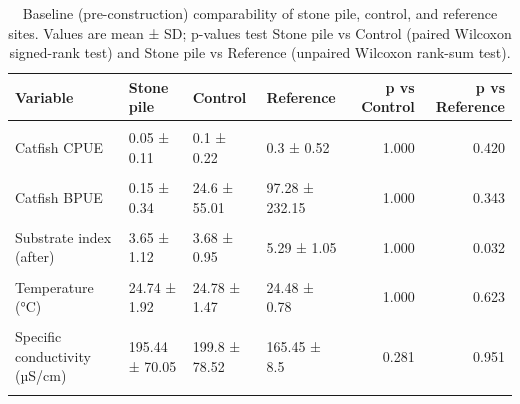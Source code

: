 \documentclass[
  12pt,
  a4paper,
  oneside]{scrbook}
\begin{document}
\begingroup\fontsize{8}{10}\selectfont

\begin{longtable}[t]{llllrr}

\caption{\label{tbl-baseline-combined-supp}Baseline (pre-construction)
comparability of stone pile, control, and reference sites. Values are
mean ± SD; p-values test Stone pile vs Control (paired Wilcoxon
signed-rank test) and Stone pile vs Reference (unpaired Wilcoxon
rank-sum test).}

\tabularnewline

\toprule
Variable & Stone pile & Control & Reference & p vs Control & p vs Reference\\
\midrule
\cellcolor{gray!8}{Kōura CPUE} & \cellcolor{gray!8}{0.2 ± 0.27} & \cellcolor{gray!8}{0.15 ± 0.22} & \cellcolor{gray!8}{2.13 ± 2.32} & \cellcolor{gray!8}{1.000} & \cellcolor{gray!8}{0.205}\\
Catfish CPUE & 0.05 ± 0.11 & 0.1 ± 0.22 & 0.3 ± 0.52 & 1.000 & 0.420\\
\cellcolor{gray!8}{Kōura BPUE} & \cellcolor{gray!8}{7.95 ± 12.15} & \cellcolor{gray!8}{2.8 ± 3.84} & \cellcolor{gray!8}{36.69 ± 36.82} & \cellcolor{gray!8}{0.789} & \cellcolor{gray!8}{0.206}\\
Catfish BPUE & 0.15 ± 0.34 & 24.6 ± 55.01 & 97.28 ± 232.15 & 1.000 & 0.343\\
\cellcolor{gray!8}{Substrate index (before)} & \cellcolor{gray!8}{3.39 ± 1.07} & \cellcolor{gray!8}{3.68 ± 0.95} & \cellcolor{gray!8}{5.29 ± 1.05} & \cellcolor{gray!8}{0.789} & \cellcolor{gray!8}{0.012}\\
\addlinespace
Substrate index (after) & 3.65 ± 1.12 & 3.68 ± 0.95 & 5.29 ± 1.05 & 1.000 & 0.032\\
\cellcolor{gray!8}{Slope (0–20 m)} & \cellcolor{gray!8}{0.06 ± 0.05} & \cellcolor{gray!8}{0.06 ± 0.04} & \cellcolor{gray!8}{0.09 ± 0.05} & \cellcolor{gray!8}{0.590} & \cellcolor{gray!8}{0.245}\\
Temperature (°C) & 24.74 ± 1.92 & 24.78 ± 1.47 & 24.48 ± 0.78 & 1.000 & 0.623\\
\cellcolor{gray!8}{Dissolved oxygen (mg/L)} & \cellcolor{gray!8}{9.85 ± 1.48} & \cellcolor{gray!8}{9.63 ± 1.29} & \cellcolor{gray!8}{10.03 ± 0.86} & \cellcolor{gray!8}{0.418} & \cellcolor{gray!8}{0.426}\\
Specific conductivity (µS/cm) & 195.44 ± 70.05 & 199.8 ± 78.52 & 165.45 ± 8.5 & 0.281 & 0.951\\
\addlinespace
\cellcolor{gray!8}{pH} & \cellcolor{gray!8}{7.5 ± 2.15} & \cellcolor{gray!8}{7.61 ± 2.2} & \cellcolor{gray!8}{8.53 ± 0.66} & \cellcolor{gray!8}{1.000} & \cellcolor{gray!8}{0.426}\\
\bottomrule

\end{longtable}
\end{document}
